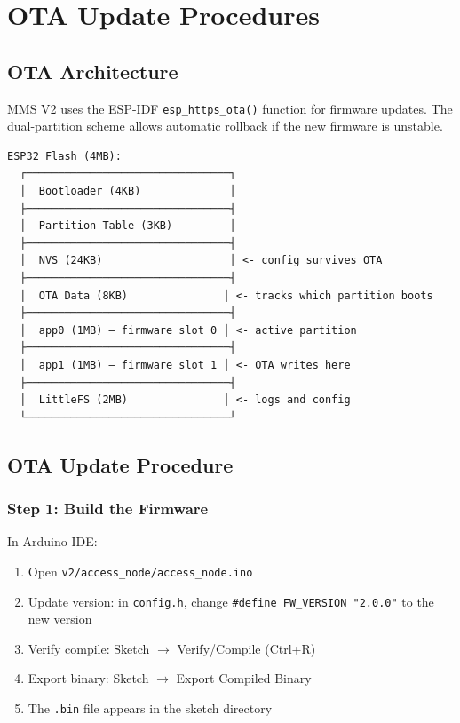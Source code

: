\chapter{OTA Update Procedures}
\label{app:ota}

\section{OTA Architecture}

MMS V2 uses the ESP-IDF \texttt{esp\_https\_ota()} function for firmware updates. The dual-partition scheme allows automatic rollback if the new firmware is unstable.

\begin{verbatim}
ESP32 Flash (4MB):
  ┌────────────────────────────────┐
  │  Bootloader (4KB)              │
  ├────────────────────────────────┤
  │  Partition Table (3KB)         │
  ├────────────────────────────────┤
  │  NVS (24KB)                    │ <- config survives OTA
  ├────────────────────────────────┤
  │  OTA Data (8KB)               │ <- tracks which partition boots
  ├────────────────────────────────┤
  │  app0 (1MB) — firmware slot 0 │ <- active partition
  ├────────────────────────────────┤
  │  app1 (1MB) — firmware slot 1 │ <- OTA writes here
  ├────────────────────────────────┤
  │  LittleFS (2MB)               │ <- logs and config
  └────────────────────────────────┘
\end{verbatim}

\section{OTA Update Procedure}

\subsection{Step 1: Build the Firmware}

In Arduino IDE:
\begin{enumerate}[leftmargin=1.5em]
    \item Open \texttt{v2/access\_node/access\_node.ino}
    \item Update version: in \texttt{config.h}, change \texttt{\#define FW\_VERSION "2.0.0"} to the new version
    \item Verify compile: Sketch $\rightarrow$ Verify/Compile (Ctrl+R)
    \item Export binary: Sketch $\rightarrow$ Export Compiled Binary
    \item The \texttt{.bin} file appears in the sketch directory
\end{enumerate}

